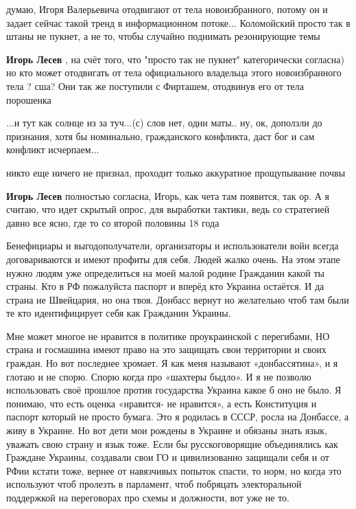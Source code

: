 \begin{itemize}
\begin{itemize} %

думаю, Игоря Валерьевича отодвигают от тела новоизбранного, потому он и задает
сейчас такой тренд в информационном потоке... Коломойский просто так в штаны не
пукнет, а не то, чтобы случайно поднимать резонирующие темы


\textbf{Игорь Лесев} , на счёт того, что "просто так не пукнет" категорически согласна) но кто может отодвигать от тела официального владельца этого новоизбранного тела ? сша? Они так же поступили с Фирташем, отодвинув его от тела порошенка
\end{itemize} %


...и тут как солнце из за туч...(с) слов нет, одни маты.. ну, ок, доползли до
признания, хотя бы номинально, гражданского конфликта, даст бог и сам конфликт
исчерпаем...

\begin{itemize} %
никто еще ничего не признал, проходит только аккуратное прощупывание почвы

\textbf{Игорь Лесев} полностью согласна, Игорь, как чета там появится, так ор. А я считаю, что идет скрытый опрос, для выработки тактики, ведь со стратегией давно все ясно, где то со второй половины 18 года
\end{itemize} %


Бенефициары и выгодополучатели, организаторы и использователи войн всегда
договариваются и имеют профиты для себя. Людей жалко очень. На этом этапе нужно
людям уже определиться на моей малой родине Гражданин какой ты страны. Кто в РФ
пожалуйста паспорт и вперёд кто Украина остаётся. И да страна не Швейцария, но
она твоя. Донбасс вернут но желательно чтоб там были те кто идентифицирует себя
как Гражданин Украины. 

Мне может многое не нравится в политике проукраинской с перегибами, НО страна и
госмашина имеют право на это защищать свои территории и своих граждан. Но вот
последнее хромает. Я как меня называют «донбассятина», и я глотаю и не спорю.
Спорю когда про «шахтеры быдло». И я не позволю использовать своё прошлое
против государства Украина какое б оно не было. Я понимаю, что есть оценка
«нравится- не нравится», а есть Конституция и паспорт который не просто бумага.
Это я родилась в СССР, росла на Донбассе, а живу в Украине. Но вот дети мои
рождены в Украине и обязаны знать язык, уважать свою страну и язык тоже. Если
бы русскоговорящие объединялись как Граждане Украины, создавали свои ГО и
цивилизованно защищали себя и от РФии кстати тоже, вернее от навязчивых попыток
спасти, то норм, но когда это используют чтоб пролезть в парламент, чтоб
побряцать электоральной поддержкой на переговорах про схемы и должности, вот
уже не то. 


\end{itemize}
